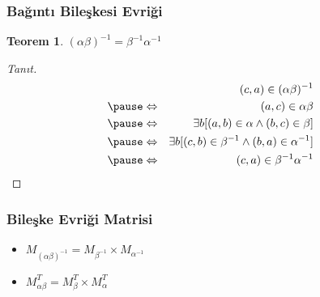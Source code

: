 \documentclass[dvipsnames]{beamer}
\theoremstyle{definition}
\theoremstyle{example}
\theoremstyle{plain}
\newtheorem{teorem}[theorem]{Teorem}
\begin{document}
\begin{frame}
  \frametitle{Bağıntı Bileşkesi Evriği}

  \begin{teorem}
    $(\alpha \beta)^{-1} = \beta^{-1} \alpha^{-1}$
  \end{teorem}

  \pause
  \begin{proof}[Tanıt]
    \begin{eqnarray*}
      &                 & (c,a) \in (\alpha \beta)^{-1}\\\pause
      & \Leftrightarrow & (a,c) \in \alpha \beta\\\pause
      & \Leftrightarrow & \exists b [(a,b) \in \alpha
                              \wedge (b,c) \in \beta]\\\pause
      & \Leftrightarrow & \exists b [(c,b) \in \beta^{-1}
                              \wedge (b,a) \in \alpha^{-1}]\\\pause
      & \Leftrightarrow & (c,a) \in \beta^{-1}\alpha^{-1}
    \end{eqnarray*}
  \end{proof}
\end{frame}

\begin{frame}
  \frametitle{Bileşke Evriği Matrisi}

  \begin{itemize}
    \item $M_{(\alpha \beta)^{-1}} = M_{\beta^{-1}} \times M_{\alpha^{-1}}$
    \item $M_{\alpha \beta}^{T} = M_{\beta}^{T} \times M_{\alpha}^{T}$
  \end{itemize}
\end{frame}
\end{document}
